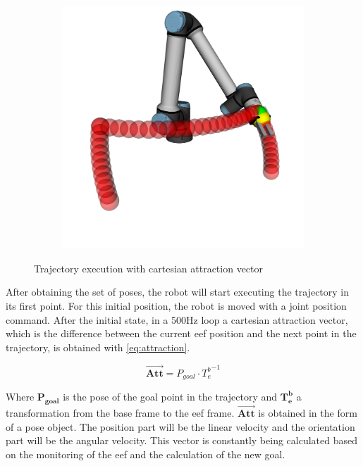 \begin{figure}[h]
\begin{subfigure}{.2\linewidth}
    \end{subfigure}%
    \begin{subfigure}{.2\linewidth}
        \centering
        \includegraphics[width=\linewidth]{figs/chp4/trajectory_4.png}
    \end{subfigure}
    \caption{Trajectory execution with cartesian attraction vector}
    \label{fig:attraction}
\end{figure}

\par After obtaining the set of poses, the robot will start executing the trajectory in its first point. For this initial position, the robot is moved with a joint position command. After the initial state, in a 500Hz loop a cartesian attraction vector, which is the difference between the current \ac{eef} position and the next point in the trajectory, is obtained with \autoref{eq:attraction}.

\begin{equation}
    \vec{\mathbf{Att}}=P_{goal}\cdot {T_e^b}^{-1}
    \label{eq:attraction}
\end{equation}

\noindent Where $\mathbf{P_{goal}}$ is the pose of the goal point in the trajectory and $\mathbf{T_e^b}$ a transformation from the base frame to the \ac{eef} frame. $\vec{\mathbf{Att}}$ is obtained in the form of a pose object. The position part will be the linear velocity and the orientation part will be the angular velocity. This vector is constantly being calculated based on the monitoring of the \ac{eef} and the calculation of the new goal.




